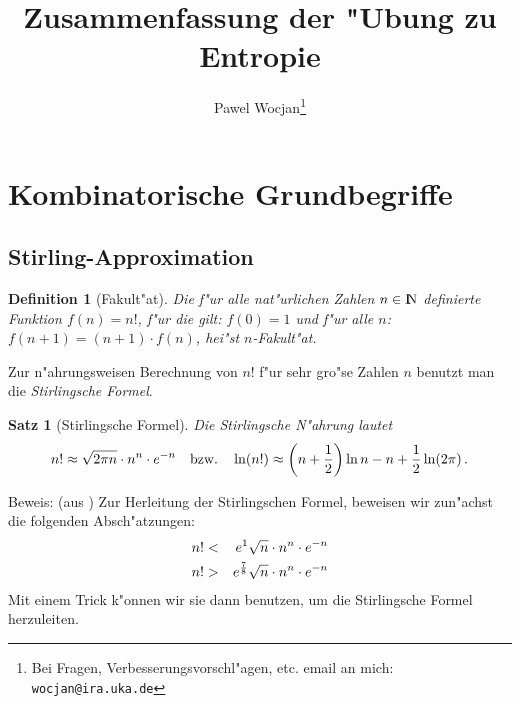 \documentclass[10pt]{article}
\title{Zusammenfassung der "Ubung zu Entropie}
\author{Pawel Wocjan\footnote{Bei Fragen, Verbesserungsvorschl"agen, etc. 
email an mich: \texttt{wocjan@ira.uka.de}}}
\newtheorem{definition}{Definition}[section]
\newtheorem{satz}[theorem]{Satz}
\begin{document}
\pagestyle{plain}
\maketitle
\tableofcontents
{}
\pagestyle{headings}


\section{Kombinatorische Grundbegriffe}
\subsection{Stirling-Approximation}
\begin{definition}[Fakult"at]
  Die f"ur alle nat"urlichen Zahlen $n\in\N$ definierte Funktion $f(n)=n!$, 
  f"ur die gilt: $f(0)=1$ und f"ur alle $n$: $f(n+1)=(n+1)\cdot f(n)$, hei"st
  $n$-Fakult"at.
\end{definition}
Zur n"ahrungsweisen Berechnung von $n!$ f"ur sehr gro"se Zahlen $n$ benutzt
man die \emph{Stirlingsche Formel}.
\begin{satz}[Stirlingsche Formel]
Die Stirlingsche N"ahrung lautet
$$
  n! \approx \sqrt{2\pi n}  \cdot n^n \cdot e^{-n} \quad\mbox{bzw.}\quad
  \ln(n!)\approx \left(n+{1\over 2}\right)\ln n - n + {1\over 2}\ln(2\pi) \,.
$$
\end{satz}
%
Beweis: (aus \cite{ham}) Zur Herleitung der Stirlingschen Formel, beweisen wir 
zun"achst die folgenden Absch"atzungen:
\begin{eqnarray*}
  n! & <    & e^1 \sqrt{n}            \cdot n^n \cdot e^{-n} \\
  n! & >    & e^{{7\over 8}} \sqrt{n} \cdot n^n \cdot e^{-n}
\end{eqnarray*}
Mit einem Trick k"onnen wir sie dann benutzen, um die Stirlingsche Formel
herzuleiten.
\end{document}
